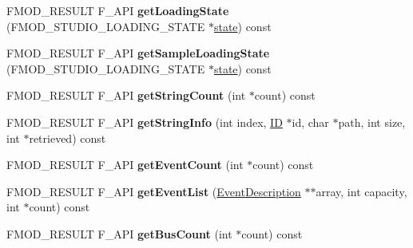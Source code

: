 \begin{DoxyCompactItemize}
\item 
\hypertarget{class_f_m_o_d_1_1_studio_1_1_bank_a7c97cdb287b71688381b5071380afe80}{F\+M\+O\+D\+\_\+\+R\+E\+S\+U\+L\+T F\+\_\+\+A\+P\+I {\bfseries get\+Loading\+State} (F\+M\+O\+D\+\_\+\+S\+T\+U\+D\+I\+O\+\_\+\+L\+O\+A\+D\+I\+N\+G\+\_\+\+S\+T\+A\+T\+E $\ast$\hyperlink{structstate}{state}) const }\label{class_f_m_o_d_1_1_studio_1_1_bank_a7c97cdb287b71688381b5071380afe80}

\item 
\hypertarget{class_f_m_o_d_1_1_studio_1_1_bank_a06378d9cdd5a7040eefe61d4ba750ccc}{F\+M\+O\+D\+\_\+\+R\+E\+S\+U\+L\+T F\+\_\+\+A\+P\+I {\bfseries get\+Sample\+Loading\+State} (F\+M\+O\+D\+\_\+\+S\+T\+U\+D\+I\+O\+\_\+\+L\+O\+A\+D\+I\+N\+G\+\_\+\+S\+T\+A\+T\+E $\ast$\hyperlink{structstate}{state}) const }\label{class_f_m_o_d_1_1_studio_1_1_bank_a06378d9cdd5a7040eefe61d4ba750ccc}

\item 
\hypertarget{class_f_m_o_d_1_1_studio_1_1_bank_ae7a0b72b58aa7616531b8efaa596f74a}{F\+M\+O\+D\+\_\+\+R\+E\+S\+U\+L\+T F\+\_\+\+A\+P\+I {\bfseries get\+String\+Count} (int $\ast$count) const }\label{class_f_m_o_d_1_1_studio_1_1_bank_ae7a0b72b58aa7616531b8efaa596f74a}

\item 
\hypertarget{class_f_m_o_d_1_1_studio_1_1_bank_a52594fcf77dcb66e3ad1e05381ebe129}{F\+M\+O\+D\+\_\+\+R\+E\+S\+U\+L\+T F\+\_\+\+A\+P\+I {\bfseries get\+String\+Info} (int index, \hyperlink{struct_f_m_o_d___g_u_i_d}{I\+D} $\ast$id, char $\ast$path, int size, int $\ast$retrieved) const }\label{class_f_m_o_d_1_1_studio_1_1_bank_a52594fcf77dcb66e3ad1e05381ebe129}

\item 
\hypertarget{class_f_m_o_d_1_1_studio_1_1_bank_abe6fbde090cbc3ded5957ebe680cd2a8}{F\+M\+O\+D\+\_\+\+R\+E\+S\+U\+L\+T F\+\_\+\+A\+P\+I {\bfseries get\+Event\+Count} (int $\ast$count) const }\label{class_f_m_o_d_1_1_studio_1_1_bank_abe6fbde090cbc3ded5957ebe680cd2a8}

\item 
\hypertarget{class_f_m_o_d_1_1_studio_1_1_bank_aa2a53d981ce87a9246fbe4b3b3e7d556}{F\+M\+O\+D\+\_\+\+R\+E\+S\+U\+L\+T F\+\_\+\+A\+P\+I {\bfseries get\+Event\+List} (\hyperlink{class_f_m_o_d_1_1_studio_1_1_event_description}{Event\+Description} $\ast$$\ast$array, int capacity, int $\ast$count) const }\label{class_f_m_o_d_1_1_studio_1_1_bank_aa2a53d981ce87a9246fbe4b3b3e7d556}

\item 
\hypertarget{class_f_m_o_d_1_1_studio_1_1_bank_ad1fb97f7464312cacb36b27b736762d0}{F\+M\+O\+D\+\_\+\+R\+E\+S\+U\+L\+T F\+\_\+\+A\+P\+I {\bfseries get\+Bus\+Count} (int $\ast$count) const }\label{class_f_m_o_d_1_1_studio_1_1_bank_ad1fb97f7464312cacb36b27b736762d0}


\end{DoxyCompactItemize}
